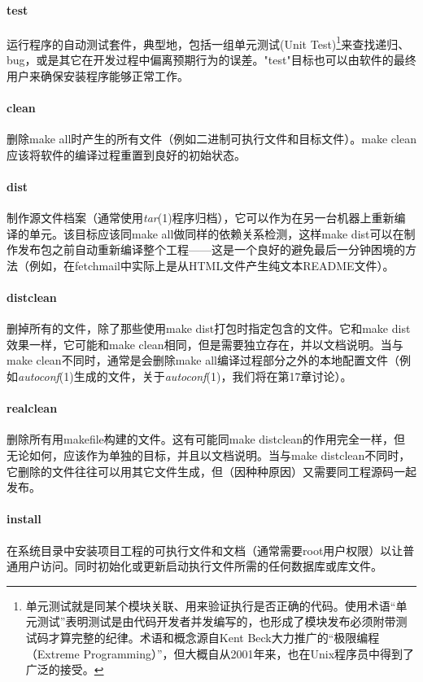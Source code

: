 \documentclass[12pt,oneside]{book}
\begin{document}
\begin{common-format}
\paragraph{test}
运行程序的自动测试套件，典型地，包括一组单元测试(Unit Test)\footnote{单元测试就是同某个模块关联、用来验证执行是否正确的代码。使用术语“单元测试”表明测试是由代码开发者并发编写的，也形成了模块发布必须附带测试码才算完整的纪律。术语和概念源自Kent Beck大力推广的“极限编程（Extreme Programming）”，但大概自从2001年来，也在Unix程序员中得到了广泛的接受。}来查找递归、bug，或是其它在开发过程中偏离预期行为的误差。"test"目标也可以由软件的最终用户来确保安装程序能够正常工作。

\paragraph{clean}
删除make all时产生的所有文件（例如二进制可执行文件和目标文件）。make clean应该将软件的编译过程重置到良好的初始状态。

\paragraph{dist}
制作源文件档案（通常使用\textit{tar}(1)程序归档），它可以作为在另一台机器上重新编译的单元。该目标应该同make all做同样的依赖关系检测，这样make dist可以在制作发布包之前自动重新编译整个工程——这是一个良好的避免最后一分钟困境的方法（例如，在fetchmail中实际上是从HTML文件产生纯文本README文件）。

\paragraph{distclean}
删掉所有的文件，除了那些使用make dist打包时指定包含的文件。它和make dist效果一样，它可能和make clean相同，但是需要独立存在，并以文档说明。当与make clean不同时，通常是会删除make all编译过程部分之外的本地配置文件（例如\textit{autoconf}(1)生成的文件，关于\textit{autoconf}(1)，我们将在第17章讨论）。

\paragraph{realclean}
删除所有用makefile构建的文件。这有可能同make distclean的作用完全一样，但无论如何，应该作为单独的目标，并且以文档说明。当与make distclean不同时，它删除的文件往往可以用其它文件生成，但（因种种原因）又需要同工程源码一起发布。

\paragraph{install}
在系统目录中安装项目工程的可执行文件和文档（通常需要root用户权限）以让普通用户访问。同时初始化或更新启动执行文件所需的任何数据库或库文件。


\end{common-format}
\end{document}

